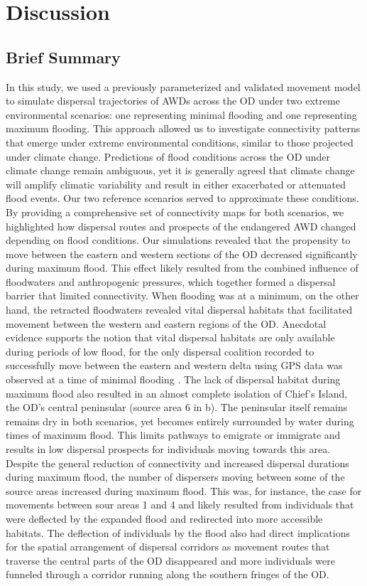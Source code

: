 \documentclass[abstract=on,10pt,a4paper,bibliography=totocnumbered]{article}
\begin{document}
\section{Discussion}
\subsection{Brief Summary}
In this study, we used a previously parameterized and validated movement model
to simulate dispersal trajectories of AWDs across the OD under two extreme
environmental scenarios: one representing minimal flooding and one representing
maximum flooding. This approach allowed us to investigate connectivity patterns
that emerge under extreme environmental conditions, similar to those projected
under climate change. Predictions of flood conditions across the OD under
climate change remain ambiguous, yet it is generally agreed that climate change
will amplify climatic variability and result in either exacerbated or attenuated
flood events. Our two reference scenarios served to approximate these
conditions. By providing a comprehensive set of connectivity maps for both
scenarios, we highlighted how dispersal routes and prospects of the endangered
AWD changed depending on flood conditions. Our simulations revealed that the
propensity to move between the eastern and western sections of the OD decreased
significantly during maximum flood. This effect likely resulted from the
combined influence of floodwaters and anthropogenic pressures, which together
formed a dispersal barrier that limited connectivity. When flooding was at a
minimum, on the other hand, the retracted floodwaters revealed vital dispersal
habitats that facilitated movement between the western and eastern regions of
the OD. Anecdotal evidence supports the notion that vital dispersal habitats are
only available during periods of low flood, for the only dispersal coalition
recorded to successfully move between the eastern and western delta using GPS
data was observed at a time of minimal flooding  \citep{Cozzi.2020}. The lack of
dispersal habitat during maximum flood also resulted in an almost complete
isolation of Chief's Island, the OD's central peninsular (source area 6 in
b). The peninsular itself remains remains dry in both scenarios,
yet becomes entirely surrounded by water during times of maximum flood. This
limits pathways to emigrate or immigrate and results in low dispersal prospects
for individuals moving towards this area. Despite the general reduction of
connectivity and increased dispersal durations during maximum flood, the number
of dispersers moving between some of the source areas increased during maximum
flood. This was, for instance, the case for movements between sour areas 1 and 4
and likely resulted from individuals that were deflected by the expanded flood
and redirected into more accessible habitats. The deflection of individuals by
the flood also had direct implications for the spatial arrangement of dispersal
corridors as movement routes that traverse the central parts of the OD
disappeared and more individuals were funneled through a corridor running
along the southern fringes of the OD.
\end{document}
